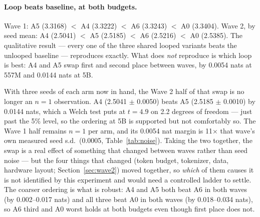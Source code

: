 \documentclass[11pt,a4paper]{article}
\begin{document}
\paragraph{Loop beats baseline, at both budgets.} Wave 1: A5 (3.3168) $<$ A4 (3.3222) $<$ A6
(3.3243) $<$ A0 (3.3404). Wave 2, by seed mean: A4 (2.5041) $<$ A5 (2.5185) $<$ A6 (2.5216) $<$ A0
(2.5385). The qualitative result --- every one of the three shared looped variants beats the
unlooped baseline --- reproduces exactly. What does \emph{not} reproduce is which loop is best: A4
and A5 swap first and second place between waves, by 0.0054 nats at 557M and 0.0144 nats at 5B.

With three seeds of each arm now in hand, the Wave 2 half of that swap is no longer an $n=1$
observation. A4 (2.5041 $\pm$ 0.0050) beats A5 (2.5185 $\pm$ 0.0010) by 0.0144 nats, which a
Welch test puts at $t = 4.9$ on 2.2 degrees of freedom --- just past the 5\% level, so the ordering
at 5B is supported but not comfortably so. The Wave 1 half remains $n=1$ per arm, and its 0.0054 nat
margin is 11$\times$ that wave's own measured seed s.d.\ (0.0005, Table~\ref{tab:noise}). Taking the
two together, the swap is a real effect of something that changed between waves rather than seed
noise --- but the four things that changed (token budget, tokenizer, data, hardware layout;
Section~\ref{sec:wave2}) moved together, so \emph{which} of them causes it is not identified by this
experiment and would need a controlled ladder to settle. The coarser ordering is what is robust: A4
and A5 both beat A6 in both waves (by 0.002--0.017 nats) and all three beat A0 in both waves (by
0.018--0.034 nats), so A6 third and A0 worst holds at both budgets even though first place does not.
\end{document}
